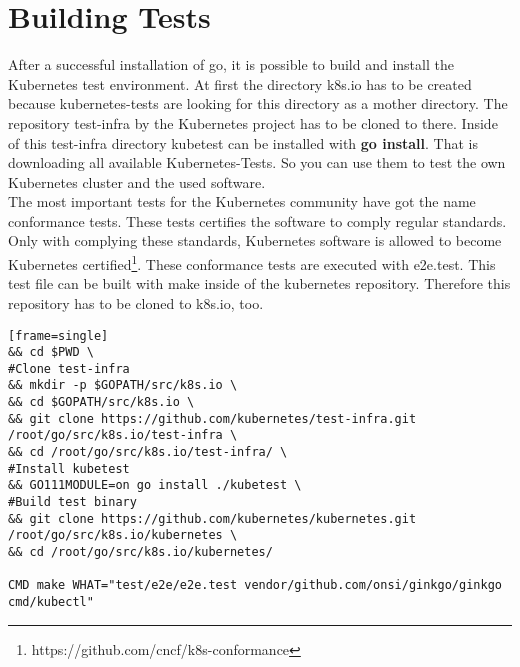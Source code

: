 \section{Building Tests}
After a successful installation of go, it is possible to build and install the Kubernetes test environment.
At first the directory k8s.io has to be created because kubernetes-tests are looking for this directory as a mother directory. The repository test-infra by the Kubernetes project has to be cloned to there. Inside of this test-infra directory kubetest can be installed with \textbf{go install}. That is downloading all available Kubernetes-Tests. So you can use them to test the own Kubernetes cluster and the used software. \\

The most important tests for the Kubernetes community have got the name conformance tests. These tests certifies the software to comply regular standards. Only with complying these standards, Kubernetes software is allowed to become Kubernetes certified\footnote{https://github.com/cncf/k8s-conformance}. 
These conformance tests are executed with e2e.test. This test file can be built with make inside of the kubernetes repository. Therefore this repository has to be cloned to k8s.io, too.


\begin{verbatim}[frame=single]
&& cd $PWD \
#Clone test-infra
&& mkdir -p $GOPATH/src/k8s.io \
&& cd $GOPATH/src/k8s.io \
&& git clone https://github.com/kubernetes/test-infra.git 
/root/go/src/k8s.io/test-infra \
&& cd /root/go/src/k8s.io/test-infra/ \
#Install kubetest
&& GO111MODULE=on go install ./kubetest \
#Build test binary
&& git clone https://github.com/kubernetes/kubernetes.git 
/root/go/src/k8s.io/kubernetes \
&& cd /root/go/src/k8s.io/kubernetes/
 
CMD make WHAT="test/e2e/e2e.test vendor/github.com/onsi/ginkgo/ginkgo cmd/kubectl"
\end{verbatim}

